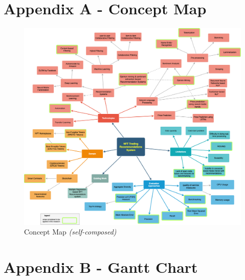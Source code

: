 \chapter{Appendix A - Concept Map}
\label{appendix:A-concept-map}

\begin{figure}[h!]
\centering
\includegraphics[width=\textwidth]{images/appendix/concept-map.png}
\caption{Concept Map \textit{(self-composed)}}
\label{fig:concept-map}
\end{figure}

\chapter{Appendix B - Gantt Chart}
\label{appendix:B-gantt-chart}

